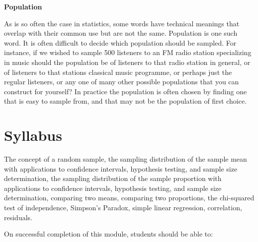 \documentclass[]{report}
\begin{document}


\textbf{Population}

As is so often the case in statistics, some words have technical
meanings that overlap with their common use but are not the same.
Population is one such word. It is often difficult to decide
which population should be sampled. For instance, if we wished to
sample 500 listeners to an FM radio station specializing in music
should the population be of listeners to that radio station in
general, or of listeners to that stations classical music
programme, or perhaps just the regular listeners, or any one of
many other possible populations that you can construct for
yourself? In practice the population is often chosen by finding
one that is easy to sample from, and that may not be the
population of first choice.


\section{Syllabus}


The concept of a random sample, the sampling distribution of the sample mean with applications to confidence intervals, hypothesis testing, and sample size determination, the sampling distribution of the sample proportion with applications to confidence intervals, hypothesis testing, and sample size determination, comparing two means, comparing two proportions, the chi-squared test of independence, Simpson's Paradox, simple linear regression, correlation, residuals.

\smallskip
On successful completion of this module, students should be able to:
\end{document}
